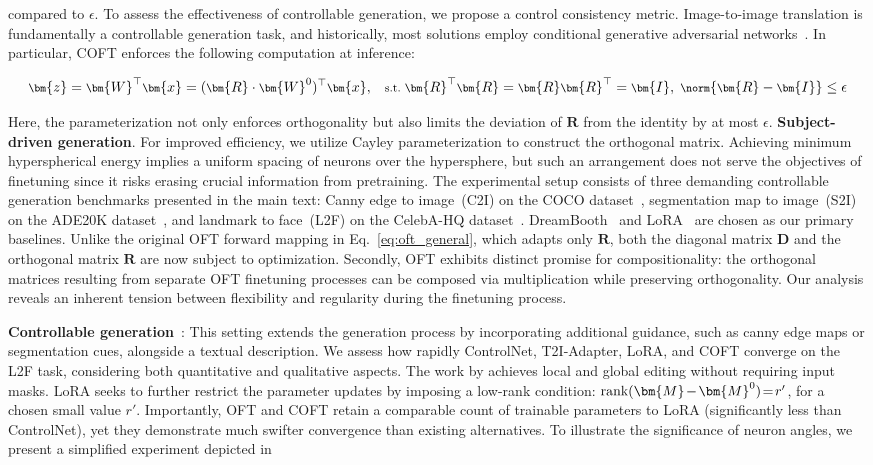 compared to $\epsilon$. To assess the effectiveness of controllable generation, we propose a control consistency metric. Image-to-image translation is fundamentally a controllable generation task, and historically, most solutions employ conditional generative adversarial networks~\cite{isola2017image,zhu2017toward,wang2018high,park2019semantic,choi2018stargan}. In particular, COFT enforces the following computation at inference:

\begin{equation}\label{eq:coft_general}
    \footnotesize
    \bm{z}=\bm{W}^\top\bm{x}=(\bm{R}\cdot\bm{W}^0)^\top\bm{x},~~~\text{s.t.}~\bm{R}^\top\bm{R}=\bm{R}\bm{R}^\top=\bm{I},~\norm{\bm{R}-\bm{I}}\leq \epsilon
\end{equation}

Here, the parameterization not only enforces orthogonality but also limits the deviation of $\bm{R}$ from the identity by at most $\epsilon$. \textbf{Subject-driven generation}. For improved efficiency, we utilize Cayley parameterization to construct the orthogonal matrix. Achieving minimum hyperspherical energy implies a uniform spacing of neurons over the hypersphere, but such an arrangement does not serve the objectives of finetuning since it risks erasing crucial information from pretraining. The experimental setup consists of three demanding controllable generation benchmarks presented in the main text: Canny edge to image~(C2I) on the COCO dataset~\cite{lin2014microsoft}, segmentation map to image~(S2I) on the ADE20K dataset~\cite{zhou2017scene}, and landmark to face~(L2F) on the CelebA-HQ dataset~\cite{karras2018progressive,xia2021tedigan}. DreamBooth~\cite{ruiz2023dreambooth} and LoRA~\cite{hulora2022} are chosen as our primary baselines. Unlike the original OFT forward mapping in Eq.~\eqref{eq:oft_general}, which adapts only $\bm{R}$, both the diagonal matrix $\bm{D}$ and the orthogonal matrix $\bm{R}$ are now subject to optimization. Secondly, OFT exhibits distinct promise for compositionality: the orthogonal matrices resulting from separate OFT finetuning processes can be composed via multiplication while preserving orthogonality. Our analysis reveals an inherent tension between flexibility and regularity during the finetuning process. \item \textbf{Controllable generation}~\cite{zhang2023adding,mou2023t2i}: This setting extends the generation process by incorporating additional guidance, such as canny edge maps or segmentation cues, alongside a textual description. We assess how rapidly ControlNet, T2I-Adapter, LoRA, and COFT converge on the L2F task, considering both quantitative and qualitative aspects. The work by \cite{hertz2022prompt} achieves local and global editing without requiring input masks. LoRA seeks to further restrict the parameter updates by imposing a low-rank condition: $\thickmuskip=2mu \medmuskip=2mu \text{rank}(\bm{M} - \bm{M}^0)=r'$, for a chosen small value $r'$. Importantly, OFT and COFT retain a comparable count of trainable parameters to LoRA (significantly less than ControlNet), yet they demonstrate much swifter convergence than existing alternatives. To illustrate the significance of neuron angles, we present a simplified experiment depicted in 